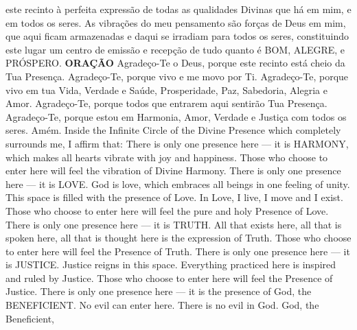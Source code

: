{\begin{songs}{}
        este recinto à perfeita expressão de todas as
        qualidades Divinas que há em mim, e em todos os
        seres.
        \parspace
        As vibrações do meu pensamento são forças de Deus
        em mim, que aqui ficam armazenadas e daqui se
        irradiam para todos os seres, constituindo este
        lugar um centro de emissão e recepção de tudo
        quanto é BOM, ALEGRE, e PRÓSPERO.
        \parspace
        \textbf{ORAÇÃO}
        \parspace
        Agradeço-Te o Deus, porque este recinto está cheio
        da Tua Presença.
        \parspace
        Agradeço-Te, porque vivo e me movo por Ti.
        \parspace
        Agradeço-Te, porque vivo em tua Vida, Verdade e
        Saúde, Prosperidade, Paz, Sabedoria, Alegria e Amor.
        \parspace
        Agradeço-Te, porque todos que entrarem aqui sentirão
        Tua Presença.
        \parspace
        Agradeço-Te, porque estou em Harmonia, Amor, Verdade
        e Justiça com todos os seres.
        \parspace
        Amém.
      \endverse
      \beginverse\color{englishcolor}
        \parspace
        Inside the Infinite Circle of the Divine Presence
        which completely surrounds me, I affirm that:
        \parspace
        There is only one presence here --- it is HARMONY,
        which makes all hearts vibrate with joy and happiness.
        Those who choose to enter here will feel the vibration
        of Divine Harmony.
        \parspace
        There is only one presence here --- it is LOVE.
        God is love, which embraces all beings in one
        feeling of unity. This space is filled with the
        presence of Love. In Love, I live, I move and I
        exist. Those who choose to enter here will feel
        the pure and holy Presence of Love.
        \parspace
        There is only one presence here --- it is TRUTH.
        All that exists here, all that is spoken here,
        all that is thought here is the expression of
        Truth. Those who choose to enter here will feel
        the Presence of Truth.
        \parspace
        There is only one presence here --- it is JUSTICE.
        Justice reigns in this space. Everything practiced
        here is inspired and ruled by Justice. Those who
        choose to enter here will feel the Presence of
        Justice.
        \parspace
        There is only one presence here --- it is the
        presence of God, the BENEFICIENT. No evil can enter
        here. There is no evil in God. God, the Beneficient,

\end{songs}}
